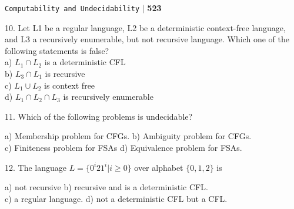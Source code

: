 \documentclass[11pt]{article}
\begin{document}
\newpage
\begin{flushright}
 \texttt{Computability and Undecidability} \hspace*{0.1cm}\textbf{$|$} \hspace*{0.1cm} \textbf{523}\hspace*{0.1cm}
\end{flushright}
\vspace*{0.5cm}

\hspace*{-0.4cm}
10. Let L1 be a regular language, L2 be a deterministic context-free language, and L3 a recursively
enumerable, but not recursive language. Which one of the following statements is false?\\

\vspace*{0.1cm}
\hspace*{0.5cm} a) $L _{1} \cap L _{2}$ is a deterministic CFL\\
\hspace*{0.5cm} b) $L _{3} \cap L _{1}$ is recursive\\
\hspace*{0.5cm} c) $L _{1} \cup L _{2}$ is context free\\
\hspace*{0.5cm} d) $L _{1} \cap L _{2} \cap L _{3}$ is recursively enumerable\\
\vspace*{0.2cm}

\hspace*{-0.4cm}
11. Which of the following problems is undecidable?\\
\vspace*{0.1cm}

\hspace*{0.5cm} a) Membership problem for CFGs. \hspace*{1cm} b) Ambiguity problem for CFGs.\\
\hspace*{0.5cm} c) Finiteness problem for FSAs  \hspace*{1.4cm} d) Equivalence problem for FSAs.\\
\vspace*{0.2cm}

\hspace*{-0.4cm}
12. The language $L = \{0 ^{i} 21 ^{i} | i \geq 0\}$ over alphabet $\{0, 1, 2\}$ is\\
\vspace*{0.1cm}

\hspace*{0.5cm} a) not recursive  \hspace*{1.8cm} b) recursive and is a deterministic CFL.\\
\hspace*{0.5cm} c) a regular language. \hspace*{1cm}  d) not a deterministic CFL but a CFL.\\
\vspace*{0.2cm}
\end{document}
